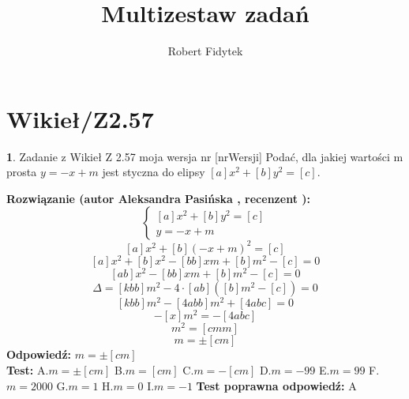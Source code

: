 \documentclass[12pt, a4paper]{article}
\title{Multizestaw zadań}
\author{Robert Fidytek}
\date{}
\theoremstyle{definition} %
\newtheorem{zad}{}
\newcommand{\kategoria}[1]{\section{#1}} %
\newcommand{\zadStart}[1]{\begin{zad}#1\newline} %
\newcommand{\zadStop}{\end{zad}}   %
\newcommand{\rozwStart}[2]{\noindent \textbf{Rozwiązanie (autor #1 , recenzent #2): }\newline} %
\newcommand{\rozwStop}{\newline}                                            %
\newcommand{\odpStart}{\noindent \textbf{Odpowiedź:}\newline}    %
\newcommand{\odpStop}{\newline}                                             %
\newcommand{\testStart}{\noindent \textbf{Test:}\newline} %
\newcommand{\testStop}{\newline} %
\newcommand{\kluczStart}{\noindent \textbf{Test poprawna odpowiedź:}\newline} %
\newcommand{\kluczStop}{\newline} %
\begin{document}
\maketitle


\kategoria{Wikieł/Z2.57}
\zadStart{Zadanie z Wikieł Z 2.57 moja wersja nr [nrWersji]}
Podać, dla jakiej wartości m prosta $y=-x+m$ jest styczna do elipsy $[a]x^2+[b]y^2=[c]$.
\zadStop
\rozwStart{Aleksandra Pasińska}{}
$$\left\{ \begin{array}{ll}
[a]x^2+[b]y^2=[c]\\ 
y=-x+m
\end{array} \right.$$
$$[a]x^2+[b](-x+m)^2=[c]$$
$$[a]x^2+[b]x^2-[bb]xm+[b]m^2-[c]=0$$
$$[ab]x^2-[bb]xm+[b]m^2-[c]=0$$
$$\Delta=[kbb]m^2-4\cdot [ab]([b]m^2-[c])=0$$
$$[kbb]m^2-[4abb]m^2+[4abc]=0$$
$$-[x]m^2=-[4abc]$$
$$m^2=[cmm]$$
$$m=\pm [cm]$$
\rozwStop
\odpStart
$m=\pm [cm]$\\
\odpStop
\testStart
A.$m=\pm [cm]$
B.$m=[cm]$
C.$m=-[cm]$
D.$m=-99$
E.$m=99$
F.$m=2000$
G.$m=1$
H.$ m=0$
I.$m=-1$
\testStop
\kluczStart
A
\kluczStop
\end{document}
